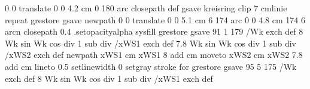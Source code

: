 {{{                      0 0 translate
                      0 0 4.2 cm 0 180 arc
                     closepath
                    } def
               gsave
                        kreisring clip
                        7 {cmlinie} repeat
              grestore
   gsave
                 newpath
                      0 0 translate
                      0 0 5.1 cm 6 174 arc
                      0 0 4.8 cm 174 6 arcn
                 closepath
                    \pst@usecolor\ProLineCol
                       0.4 .setopacityalpha
                       sysfill
   grestore
 gsave
   91 1 179 { /Wk exch def %
                       {8 Wk sin Wk cos div 1 sub div} /xWS1 exch def %
                       {7.8 Wk sin Wk cos div 1 sub div} /xWS2 exch def %
                        newpath
                        xWS1 cm xWS1 8 add cm moveto %
                        xWS2 cm xWS2 7.8 add cm %
                       lineto
                       0.5 setlinewidth
                       0 setgray
                       stroke
                   } for
  grestore
  gsave
     95 5 175 { /Wk exch def
                        {8 Wk sin Wk cos div 1 sub div} /xWS1 exch def
}}}
